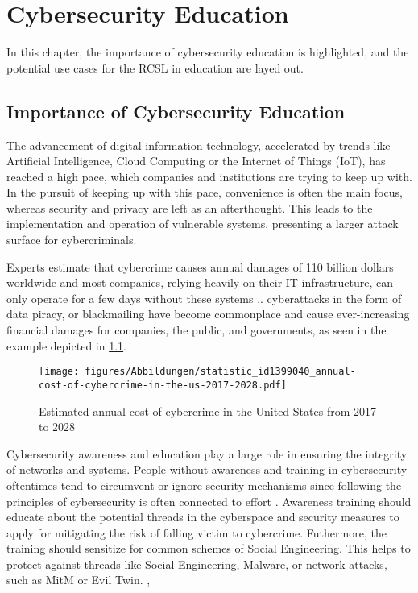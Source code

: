 \chapter{Cybersecurity Education}\label{ch:discussion}
In this chapter, the importance of cybersecurity education is highlighted, and the potential use cases for the RCSL in education are layed out.

\section{Importance of Cybersecurity Education}
The advancement of digital information technology, accelerated by trends like Artificial Intelligence, Cloud Computing or the Internet of Things (IoT), has reached a high pace, which companies and institutions are trying to keep up with.
In the pursuit of keeping up with this pace, convenience is often the main focus, whereas security and privacy are left as an afterthought. \cite[chapter~1]{Salmon_Levesque_McLafferty_2017}
This leads to the implementation and operation of vulnerable systems, presenting a larger attack surface for cybercriminals.

Experts estimate that cybercrime causes annual damages of 110 billion dollars worldwide and most companies, relying heavily on their IT infrastructure, can only operate for a few days without these systems \cite[page~3]{Hellmann_2023},\cite[page~12]{Salmon_Levesque_McLafferty_2017}. 
cyberattacks in the form of data piracy, or blackmailing have become commonplace and cause ever-increasing financial damages for companies, the public, and governments, as seen in the example depicted in \cref{fig:cost_of_cybercrime}.

\begin{figure}[h]
    \centering
    \texttt{[image: figures/Abbildungen/statistic\_id1399040\_annual-cost-of-cybercrime-in-the-us-2017-2028.pdf]}
    \caption{Estimated annual cost of cybercrime in the United States from 2017 to 2028 \cite{statista_cc}}
    \label{fig:cost_of_cybercrime}
\end{figure}

Cybersecurity awareness and education play a large role in ensuring the integrity of networks and systems. 
People without awareness and training in cybersecurity oftentimes tend to circumvent or ignore security mechanisms since following the principles of cybersecurity is often connected to effort \cite{Hellmann_2023}.
Awareness training should educate about the potential threads in the cyberspace and security measures to apply for mitigating the risk of falling victim to cybercrime.
Futhermore, the training should sensitize for common schemes of Social Engineering.
This helps to protect against threads like Social Engineering, Malware, or network attacks, such as MitM or Evil Twin. \cite[page~24-25]{IT_Basiswissen}, \cite{mariano2024wifi}

